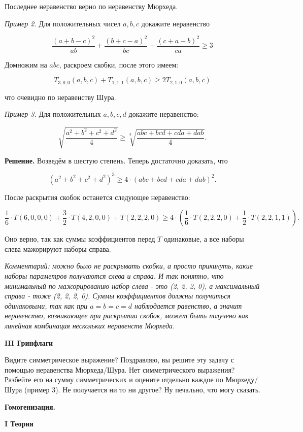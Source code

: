 Последнее неравенство верно по неравенству Мюрхеда.

\textit{Пример 2.}
Для положительных чисел $a, b, c$ докажите неравенство

$$
\frac{(a+b-c)^2}{a b}+\frac{(b+c-a)^2}{b c}+\frac{(c+a-b)^2}{c a} \geqslant 3
$$

Домножим на $a b c$, раскроем скобки, после этого имеем:

$$
T_{3,0,0}(a, b, c)+T_{1,1,1}(a, b, c) \geqslant 2 T_{2,1,0}(a, b, c)
$$


что очевидно по неравенству Шура.

\textit{Пример 3.}
Для положительных $a, b, c, d$ докажите неравенство:

$$
\sqrt{\frac{a^2+b^2+c^2+d^2}{4}} \geqslant \sqrt[3]{\frac{a b c+b c d+c d a+d a b}{4}} .
$$


\textbf{Решение.}
Возведём в шестую степень. Теперь достаточно доказать, что

$$
\left(a^2+b^2+c^2+d^2\right)^3 \geqslant 4 \cdot(a b c+b c d+c d a+d a b)^2 .
$$


После раскрытия скобок останется следующее неравенство:

$$
\frac{1}{6} \cdot T(6,0,0,0)+\frac{3}{2} \cdot T(4,2,0,0)+T(2,2,2,0) \geqslant 4 \cdot\left(\frac{1}{6} \cdot T(2,2,2,0)+\frac{1}{2} \cdot T(2,2,1,1)\right) .
$$


Оно верно, так как суммы коэффициентов перед $T$ одинаковые, а все наборы слева мажорируют наборы справа.

\textit{Комментарий: можно было не раскрывать скобки, а просто прикинуть, какие наборы параметров получаются слева и справа. И так понятно, что минимальный по мажорированию набор слева - это (2, 2, 2, 0), а максимальный справа - тоже (2, 2, 2, 0). Суммы коэффициентов должны получиться одинаковыми, так как при $a=b=c=d$ наблюдается равенство, а значит неравенство, возникающее при раскрытии скобок, может быть получено как линейная комбинация нескольких неравенств Мюрхеда.}

\textbf{III Гринфлаги}

Видите симметрическое выражение? Поздравляю, вы решите эту задачу с помощью неравенства Мюрхеда/Шура. Нет симметрического выражения? Разбейте его на сумму симметрических и оцените отдельно каждое по Мюрхеду/Шура (пример 3). Не получается ни то ни другое? Ну печально, что могу сказать.

\textbf{\Large Гомогенизация.}

\textbf{I Теория}

